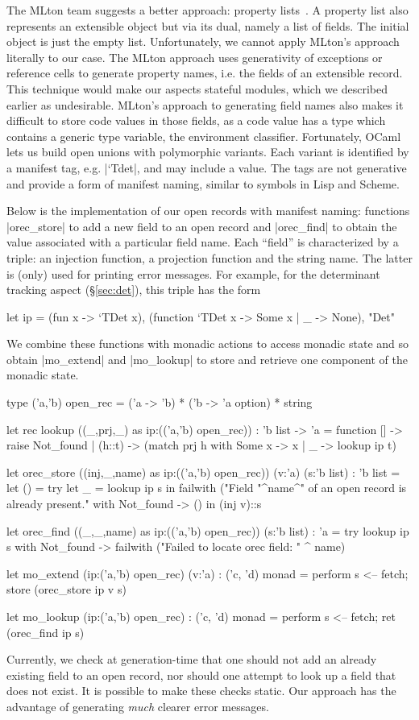 \documentclass{elsart}
\begin{document}
The MLton team suggests a better approach: property 
lists~\cite{mlton-proplist}.  A property list also represents an
extensible object but via its dual, namely a list of fields.  The
initial object is just the empty list.  Unfortunately, we cannot apply
MLton's approach literally to our case. The MLton
approach uses generativity of exceptions or reference cells to
generate property names, i.e. the fields of an extensible record. This
technique would make our aspects stateful modules, which we described
earlier as undesirable. MLton's approach to generating field names also makes
it difficult to store code values in those fields, as a code value has a type
which contains a generic type variable, the environment classifier. 
Fortunately, OCaml lets us build open unions with
polymorphic variants. Each variant is identified by a manifest tag,
e.g. |`Tdet|, and may include a value. The tags are not generative and
provide a form of manifest naming, similar to symbols in Lisp and Scheme.

Below is the implementation of our open records with manifest
naming: functions |orec_store| to add a new field to an open record
and |orec_find| to obtain the value associated with a particular field
name. Each ``field'' is characterized by a triple: an injection function, 
a projection function and the string name. The latter is (only) used for 
printing error messages. For example, for the
determinant tracking aspect (\S\ref{sec:det}), this triple has the form
\begin{code}
let ip = 
  (fun x -> `TDet x), (function `TDet x -> Some x | _ -> None), "Det"
\end{code}
We combine these functions with monadic
actions to access monadic state and so obtain 
|mo_extend| and |mo_lookup| to store and retrieve one component 
of the monadic state.
\begin{code}
type ('a,'b) open_rec = ('a -> 'b) * ('b -> 'a option)  * string

let rec lookup ((_,prj,_) as ip:(('a,'b) open_rec)) : 'b list -> 'a = 
   function [] -> raise Not_found
   | (h::t) -> (match prj h with Some x -> x | _ -> lookup ip t)

let orec_store ((inj,_,name) as ip:(('a,'b) open_rec)) (v:'a) (s:'b list) 
   : 'b list =
  let () = 
    try let _ = lookup ip s in 
        failwith ("Field "^name^" of an open record is already present."
    with Not_found -> () in
  (inj v)::s

let orec_find ((_,_,name) as ip:(('a,'b) open_rec)) (s:'b list) : 'a =
  try lookup ip s 
  with Not_found -> failwith ("Failed to locate orec field: " ^ name)

let mo_extend (ip:('a,'b) open_rec) (v:'a) : ('c, 'd) monad = 
  perform s <-- fetch; store (orec_store ip v s)

let mo_lookup (ip:('a,'b) open_rec) : ('c, 'd) monad =
  perform s <-- fetch; ret (orec_find ip s)
\end{code}
%
Currently, we check at generation-time that one should not add an
already existing field to an open record, nor should one attempt to
look up a field that does not exist. It is possible to make these
checks static.  Our approach has the advantage of generating \emph{much}
clearer error messages.
\end{document}
